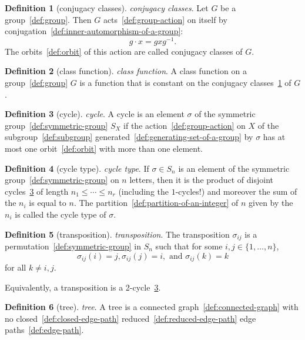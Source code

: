 \documentclass[12pt,a4paper]{article}
\theoremstyle{definition}
\newtheorem{definition}{Definition}
\begin{document}
\begin{definition}[conjugacy classes]\label{def:conjugacy-classes}
\emph{conjugacy classes}. Let $G$ be a group~\ref{def:group}. Then $G$ acts~\ref{def:group-action} on itself by conjugation~\ref{def:inner-automorphism-of-a-group}: $$g\cdot x = gxg^{-1}.$$ The orbits~\ref{def:orbit} of this action are called conjugacy classes of $G$.
\end{definition}

\begin{definition}[class function]\label{def:class-function}
\emph{class function}. A class function on a group~\ref{def:group} $G$ is a function that is constant on the conjugacy classes~\ref{def:conjugacy-classes} of $G$.
\end{definition}

\begin{definition}[cycle]\label{def:cycle}
\emph{cycle}. A cycle is an element $\sigma$ of the symmetric group~\ref{def:symmetric-group} $S_X$ if the action~\ref{def:group-action} on $X$ of the subgroup~\ref{def:subgroup} generated~\ref{def:generating-set-of-a-group} by $\sigma$ has at most one orbit~\ref{def:orbit} with more than one element.
\end{definition}

\begin{definition}[cycle type]\label{def:cycle-type}
\emph{cycle type}. If $\sigma \in S_n$ is an element of the symmetric group~\ref{def:symmetric-group} on $n$ letters, then it is the product of disjoint cycles~\ref{def:cycle} of length $n_1\leq\cdots\leq n_r$ (including the $1$-cycles!) and moreover the sum of the $n_i$ is equal to $n$. The partition~\ref{def:partition-of-an-integer} of $n$ given by the $n_i$ is called the cycle type of $\sigma$.
\end{definition}

\begin{definition}[transposition]\label{def:transposition}
\emph{transposition}. The transposition $\sigma_{ij}$ is a permutation~\ref{def:symmetric-group} in $S_n$ such that for some $i,j \in \{1,\dots ,n\}$, $$\sigma_{ij}(i) = j, \sigma_{ij}(j) = i, \text{ and } \sigma_{ij}(k) = k$$ for all $k\neq i,j$.

Equivalently, a transposition is a 2-cycle~\ref{def:cycle}.
\end{definition}

\begin{definition}[tree]\label{def:tree}
\emph{tree}. A tree is a connected graph~\ref{def:connected-graph} with no closed~\ref{def:closed-edge-path} reduced~\ref{def:reduced-edge-path} edge paths~\ref{def:edge-path}.
\end{definition}
\end{document}
